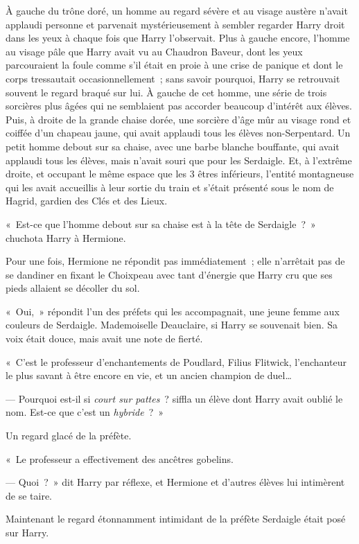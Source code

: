 À gauche du trône doré, un homme au regard sévère et au visage austère n'avait applaudi personne et parvenait mystérieusement à sembler regarder Harry droit dans les yeux à chaque fois que Harry l'observait. Plus à gauche encore, l'homme au visage pâle que Harry avait vu au Chaudron Baveur, dont les yeux parcouraient la foule comme s'il était en proie à une crise de panique et dont le corps tressautait occasionnellement~; sans savoir pourquoi, Harry se retrouvait souvent le regard braqué sur lui. À gauche de cet homme, une série de trois sorcières plus âgées qui ne semblaient pas accorder beaucoup d'intérêt aux élèves. Puis, à droite de la grande chaise dorée, une sorcière d'âge mûr au visage rond et coiffée d'un chapeau jaune, qui avait applaudi tous les élèves non-Serpentard. Un petit homme debout sur sa chaise, avec une barbe blanche bouffante, qui avait applaudi tous les élèves, mais n'avait souri que pour les Serdaigle. Et, à l'extrême droite, et occupant le même espace que les 3 êtres inférieurs, l'entité montagneuse qui les avait accueillis à leur sortie du train et s'était présenté sous le nom de Hagrid, gardien des Clés et des Lieux.

«~Est-ce que l'homme debout sur sa chaise est à la tête de Serdaigle~?~» chuchota Harry à Hermione.

Pour une fois, Hermione ne répondit pas immédiatement~; elle n'arrêtait pas de se dandiner en fixant le Choixpeau avec tant d'énergie que Harry cru que ses pieds allaient se décoller du sol.

«~Oui,~» répondit l'un des préfets qui les accompagnait, une jeune femme aux couleurs de Serdaigle. Mademoiselle Deauclaire, si Harry se souvenait bien. Sa voix était douce, mais avait une note de fierté.

«~C'est le professeur d'enchantements de Poudlard, Filius Flitwick, l'enchanteur le plus savant à être encore en vie, et un ancien champion de duel…

--- Pourquoi est-il si \emph{court sur pattes}~? siffla un élève dont Harry avait oublié le nom. Est-ce que c'est un \emph{hybride}~?~»

Un regard glacé de la préfète.

«~Le professeur a effectivement des ancêtres gobelins.

--- Quoi~?~» dit Harry par réflexe, et Hermione et d'autres élèves lui intimèrent de se taire.

Maintenant le regard étonnamment intimidant de la préfète Serdaigle était posé sur Harry.


